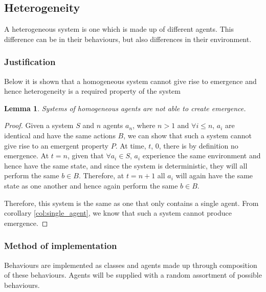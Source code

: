 \documentclass{article}
\newtheorem{lemma}[theorem]{Lemma}
\begin{document}
  \subsection{Heterogeneity}
  
    A heterogeneous system is one which is made up of different agents. This difference can be in their behaviours, but also differences in their environment. 


    \subsubsection{Justification}

      Below it is shown that a homogeneous system cannot give rise to emergence and hence heterogeneity is a required property of the system
        
      
      \begin{lemma}
        Systems of homogeneous agents are not able to create emergence. 
      \end{lemma}
      \begin{proof}

        Given a system $S$ and $n$ agents $a_n$, where $n > 1$ and $\forall i \leq n$, $a_i$ are identical and have the same actions $B$, we can show that such a system cannot give rise to an emergent property $P$. At time, $t$, 0, there is by definition no emergence. At $t=n$, given that $\forall a_i \in S$, $a_i$ experience the same environment and hence have the same state, and since the system is deterministic, they will all perform the same $b \in B$. Therefore, at $t=n+1$ all $a_i$ will again have the same state as one another and hence again perform the same $b \in B$.

        Therefore, this system is the same as one that only contains a single agent. From corollary \ref{col:single_agent}, we know that such a system cannot produce emergence.

      \end{proof}

    \subsubsection{Method of implementation}
      
      Behaviours are implemented as classes and agents made up through composition of these behaviours. Agents will be supplied with a random assortment of possible behaviours.
\end{document}

